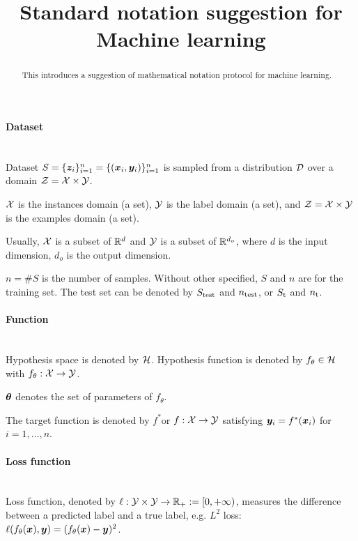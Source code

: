 \documentclass[]{report}
\begin{document}
\title{Standard notation suggestion for Machine learning}
\author{}

\maketitle 
\begin{abstract}
This introduces a suggestion of mathematical notation protocol for machine learning.
\end{abstract}

\paragraph{Dataset}~\\
Dataset  $S=\{\bm{z}_i\}_{i=1}^n=\{(\bm{x}_i,\bm{y}_i)\}_{i=1}^n$ is sampled from a distribution $\mathcal{D}$ over a domain $\mathcal{Z}=\mathcal{X}\times\mathcal{Y}$. 

$\mathcal{X}$  is the instances domain (a set), $\mathcal{Y}$ is the label domain (a set), and $\mathcal{Z}=\mathcal{X}\times\mathcal{Y}$ is the examples domain (a set). 

Usually, 
$\mathcal{X}$ is a subset of $\mathbb{R}^d$ and $\mathcal{Y}$ is a subset of $\mathbb{R}^{d_{o}}$, where $d$ is the input dimension, $d_{o}$ is the output dimension.

$n=\#S$ is the number of samples. Without other specified, $S$ and $n$ are for the training set. The test set can be denoted by $S_{\rm test}$ and $n_{\rm test}$, or $S_{\rm t}$ and $n_{\rm t}$.

\paragraph{Function}~\\
Hypothesis space is denoted by $\mathcal{H}$. Hypothesis function is denoted by $f_{\theta}\in\mathcal{H}$ with $f_{\theta}:\mathcal{X}\to\mathcal{Y}$.

$\bm{\theta}$  denotes the set of parameters of  $f_{\theta}$.  

The target function is denoted by $f^*$or $f:\mathcal{X}\to\mathcal{Y}$ satisfying $\bm{y}_i=f^*(\bm{x}_i)$ for $i=1,\ldots,n$.

\paragraph{Loss function}~\\
Loss function, denoted by $\ell:\mathcal{Y}\times\mathcal{Y}\to\mathbb{R}_+:=[0,+\infty)$, measures the difference between a predicted label and a true label, e.g. $L^2$ loss: $\ell(f_{\theta}(\bm{x}),\bm{y})=(f_{\theta}(\bm{x})-\bm{y})^2$.
\end{document}
